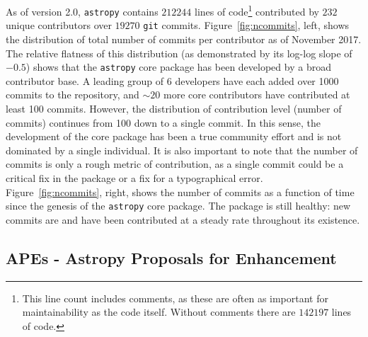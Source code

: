 \documentclass[modern]{aastex61}
\newcommand{\package}[1]{\texttt{#1}\xspace}
\newcommand{\astropypkg}{\package{astropy}}
\renewcommand{\figurename}{Figure\xspace}
\begin{document}
As of version 2.0, \astropypkg contains $212244$ lines of code\footnote{This
line count includes comments, as these are often as important for
maintainability as the code itself.  Without comments there are $142197$ lines
of code.} contributed by $232$ unique contributors over $19270$ \texttt{git}
commits.
\figurename~\ref{fig:ncommits}, left, shows the distribution of total number of
commits per contributor as of November 2017.
The relative flatness of this distribution (as demonstrated by its log-log slope of
$-0.5$) shows that the \astropypkg core package has been developed by a broad
contributor base.  A leading group of 6 developers have each added over 1000
commits to the repository, and $\sim 20$ more core contributors have contributed
at least 100 commits.
However, the distribution of contribution level (number of commits) continues
from 100 down to a single commit.
In this sense, the development of the core package has been a true community
effort and is not dominated by a single individual.
It is also important to note that the number of commits is only a rough metric
of contribution, as a single commit could be a critical fix in the package or a
fix for a typographical error.
\figurename~\ref{fig:ncommits}, right, shows the number of commits as a
function of time since the genesis of the \astropypkg core package.
The package is still healthy: new commits are and have been contributed at a
steady rate throughout its existence.

\subsection{APEs - Astropy Proposals for Enhancement}
\end{document}
